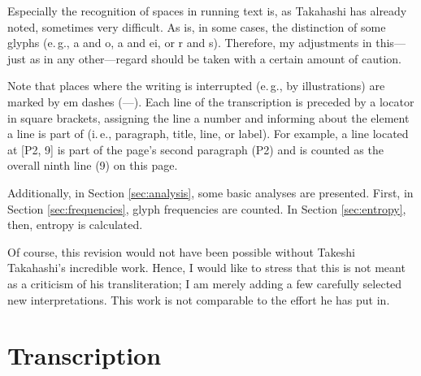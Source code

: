 \documentclass{scrarticle}
\begin{document}
Especially the recognition of spaces in running text is, as Takahashi has already noted, sometimes very difficult.
As is, in some cases, the distinction of some glyphs (e.\,g., {\eva a} and {\eva o}, {\eva a} and {\eva ei}, or {\eva r} and {\eva s}).
Therefore, my adjustments in this---just as in any other---regard should be taken with a certain amount of caution.

Note that places where the writing is interrupted (e.\,g., by illustrations) are marked by em dashes (---).
Each line of the transcription is preceded by a locator in square brackets, assigning the line a number and informing about the element a line is part of (i.\,e., paragraph, title, line, or label).
For example, a line located at [P2, 9] is part of the page's second paragraph (P2) and is counted as the overall ninth line (9) on this page.

Additionally, in Section \ref{sec:analysis}, some basic analyses are presented.
First, in Section \ref{sec:frequencies}, glyph frequencies are counted.
In Section \ref{sec:entropy}, then, entropy is calculated.

Of course, this revision would not have been possible without Takeshi Takahashi's incredible work.
Hence, I would like to stress that this is not meant as a criticism of his transliteration; I am merely adding a few carefully selected new interpretations.
This work is not comparable to the effort he has put in.


\clearpage
\section{Transcription}\label{sec:transcription}


\end{document}
